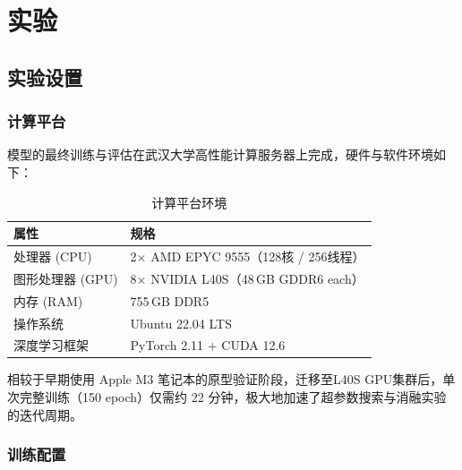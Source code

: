
\section{实验}

\subsection{实验设置}

\subsubsection{计算平台}

模型的最终训练与评估在武汉大学高性能计算服务器上完成，硬件与软件环境如下：

\begin{table}[h]
\centering
\caption{计算平台环境}
\begin{tabular}{ll}
\toprule
\textbf{属性} & \textbf{规格} \\
\midrule
处理器 (CPU) & 2$\times$ AMD EPYC 9555（128核 / 256线程）\\
图形处理器 (GPU) & 8$\times$ NVIDIA L40S（48\,GB GDDR6 each）\\
内存 (RAM) & 755\,GB DDR5 \\
操作系统 & Ubuntu 22.04 LTS \\
深度学习框架 & PyTorch 2.11 + CUDA 12.6 \\
\bottomrule
\end{tabular}
\end{table}

相较于早期使用 Apple M3 笔记本的原型验证阶段，迁移至L40S GPU集群后，单次完整训练（150 epoch）仅需约 22 分钟，极大地加速了超参数搜索与消融实验的迭代周期。

\subsubsection{训练配置}

